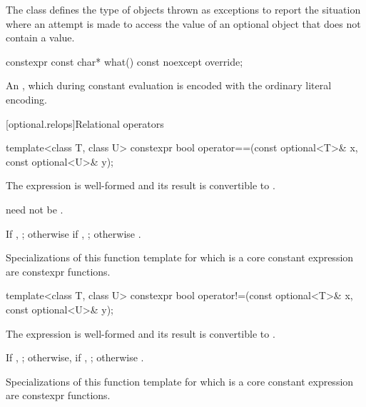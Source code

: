 \pnum
The class  defines the type of objects thrown as exceptions to report the situation where an attempt is made to access the value of an optional object that does not contain a value.

%
\begin{itemdecl}
constexpr const char* what() const noexcept override;
\end{itemdecl}

\begin{itemdescr}
\pnum
\returns
An  \ntbs{},
which during constant evaluation is encoded with
the ordinary literal encoding.
\end{itemdescr}

[optional.relops]{Relational operators}

%
\begin{itemdecl}
template<class T, class U> constexpr bool operator==(const optional<T>& x, const optional<U>& y);
\end{itemdecl}

\begin{itemdescr}
\pnum
\constraints
The expression  is well-formed and
its result is convertible to .
\begin{note}
 need not be .
\end{note}

\pnum
\returns
If , ; otherwise if , ; otherwise .

\pnum
\remarks
Specializations of this function template
for which  is a core constant expression
are constexpr functions.
\end{itemdescr}

%
\begin{itemdecl}
template<class T, class U> constexpr bool operator!=(const optional<T>& x, const optional<U>& y);
\end{itemdecl}

\begin{itemdescr}
\pnum
\constraints
The expression  is well-formed and
its result is convertible to .

\pnum
\returns
If , ;
otherwise, if , ;
otherwise .

\pnum
\remarks
Specializations of this function template
for which  is a core constant expression
are constexpr functions.
\end{itemdescr}

